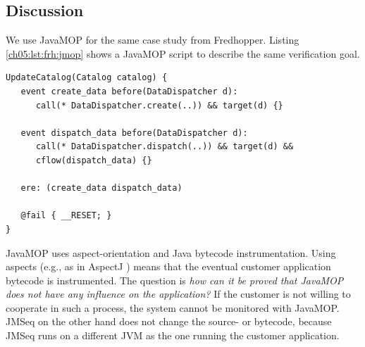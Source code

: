 
\subsection{Discussion} \label{ch05:sec:discuss-jmop}

We use JavaMOP \cite{chen_rosu_jmop,chen_rosu_mop,MOP} for the same case study from Fredhopper. 
Listing \ref{ch05:lst:frh:jmop} shows a JavaMOP script to describe the same verification goal.

\begin{lstlisting}[label=ch05:lst:frh:jmop, caption=Fredhopper case study with JavaMOP]
UpdateCatalog(Catalog catalog) {
   event create_data before(DataDispatcher d):
      call(* DataDispatcher.create(..)) && target(d) {}

   event dispatch_data before(DataDispatcher d):
      call(* DataDispatcher.dispatch(..)) && target(d) &&
      cflow(dispatch_data) {}

   ere: (create_data dispatch_data)

   @fail { __RESET; }
}
\end{lstlisting}
JavaMOP uses aspect-orientation and Java bytecode instrumentation.
Using aspects (e.g., as in AspectJ \cite{kiczales_aspectj}) means that the eventual customer application bytecode is instrumented.
The question is \emph{how can it be proved that JavaMOP does not have any influence on the application?}
If the customer is not willing to cooperate in such a process, the system cannot be monitored with JavaMOP.
JMSeq on the other hand does not change the source- or bytecode, because JMSeq runs on a different JVM as the one running the customer application.


